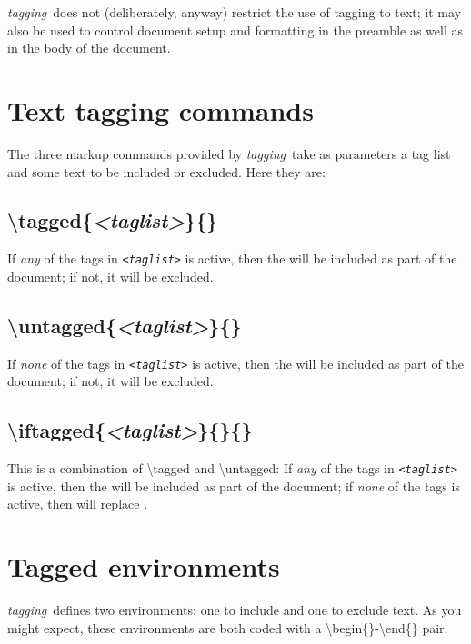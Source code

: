 \documentclass[a4paper,12pt,twoside,openany]{memoir}
\newcommand{\tpname}{\textsf{\itshape tagging}}
\begin{document}
\tpname\ does not (deliberately, anyway) restrict the use of tagging to text;
it may also be used to control document setup and formatting in the preamble
as well as in the body of the document.
\section{Text tagging commands}
The three markup commands provided by \tpname\
take as parameters a tag list and some text to be included or excluded.
Here they are:
\subsection{{\ttfamily\textbackslash tagged\{{\itshape<taglist>}\}\{{\itshape<source text>}\}}}
If \emph{any} of the tags in \texttt{\itshape<taglist>} is active,
then the \texttt{\itshape<source text>} will be included as part of the document;
if not, it will be excluded.
\subsection{{\ttfamily\textbackslash untagged\{{\itshape<taglist>}\}\{{\itshape<alt text>}\}}}
If \emph{none} of the tags in \texttt{\itshape<taglist>} is active,
then the \texttt{\itshape<alt text>} will be included as part of the document;
if not, it will be excluded.
\subsection{{\ttfamily\textbackslash iftagged\{{\itshape<taglist>}\}\{{\itshape<source text>}\}\{{\itshape<alt text>}\}}}
This is a combination of {\ttfamily\textbackslash tagged} and {\ttfamily\textbackslash untagged}:
If \emph{any} of the tags in \texttt{\itshape<taglist>} is active,
then the \texttt{\itshape<source text>} will be included as part of the document;
if \emph{none} of the tags is active,
then \texttt{\itshape<alt text>} will replace \texttt{\itshape<source text>}.

\section{Tagged environments}
\tpname\ defines two environments: one to include and one to exclude text.
As you might expect, these environments are both coded with a
{\ttfamily\textbackslash begin\{\}}-{\ttfamily\textbackslash end\{\}} pair.
\end{document}
